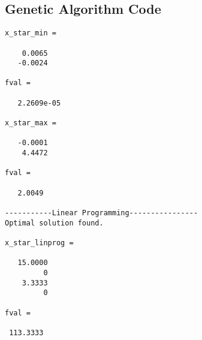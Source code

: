 \documentclass[11pt]{article}
\begin{document}
\subsection*{Genetic Algorithm Code}









\begin{lstlisting}[caption={Output},label={lst:op}]
x_star_min =

    0.0065
   -0.0024

fval =

   2.2609e-05

x_star_max =

   -0.0001
    4.4472

fval =

   2.0049

-----------Linear Programming----------------
Optimal solution found.

x_star_linprog =

   15.0000
         0
    3.3333
         0

fval =

 113.3333
\end{lstlisting}
\end{document}
